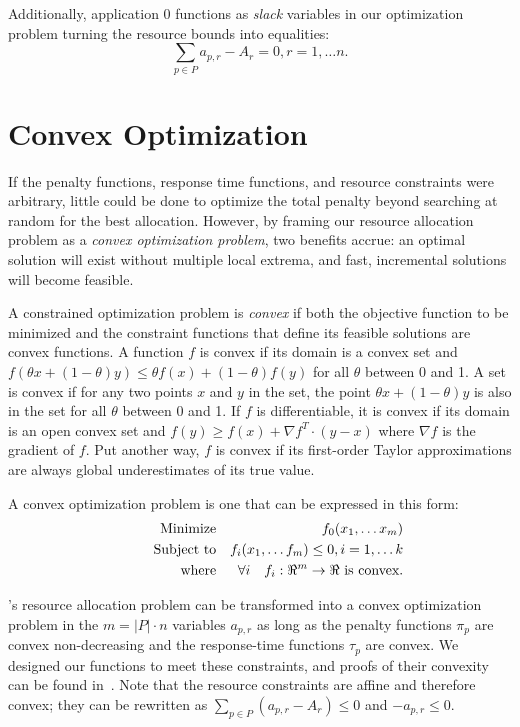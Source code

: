 Additionally, application 0 functions as \emph{slack} variables in our optimization problem turning the resource bounds into equalities:
\begin{equation}
\sum_{p\in P} a_{p,r} - A_r = 0, r = 1,\dots n.
\end{equation}

\section{Convex Optimization}

If the penalty functions, response time functions, and resource
constraints were arbitrary, little could be done to optimize the total
penalty beyond searching at random for the best allocation.  However,
by framing our resource allocation problem as a \emph{convex
  optimization problem}\cite{BoVa}, two benefits accrue: an optimal
solution will exist without multiple local extrema, and fast,
incremental solutions will become feasible.

A constrained optimization problem is \emph{convex} if both the objective function to be minimized
and the constraint functions that define its feasible solutions are convex functions.
A function $f$ is convex if its domain is a convex set and
$f(\theta x + (1-\theta)y) \leq \theta f(x) + (1-\theta)f(y)$
for all $\theta$ between 0 and 1.
A set is convex if for any two points $x$ and $y$ in the set, the point
$\theta x + (1-\theta)y$
is also in the set for all $\theta$ between 0 and 1.
If $f$ is differentiable, it is convex if its domain is an open convex set and
$f(y) \geq f(x) + \nabla f^T\cdot(y-x)$ where $\nabla f$ is the gradient of $f$.
Put another way, $f$ is convex if its first-order Taylor approximations
are always global underestimates of its true value.

A convex optimization problem is one that can be expressed in this form:
\begin{eqnarray*}
& \makebox[1in][r]{Minimize}   & f_0(x_1,\ldots x_m)                              \\
& \makebox[1in][r]{Subject to} & f_i(x_1,\ldots f_m) \leq 0, i = 1,\ldots k        \\
& \makebox[1in][r]{where}      & \forall i \quad f_i:\Re^m \rightarrow \Re \mbox{ is convex.}
\end{eqnarray*}


\pacora's resource allocation problem can be transformed into a convex
optimization problem in the $m = |P|\cdot n$ variables $a_{p,r}$ as
long as the penalty functions $\pi_p$ are convex non-decreasing and
the response-time functions $\tau_p$ are convex.  We designed our
functions to meet these constraints, and proofs of their convexity can
be found in~\cite{pacora_tr}.
Note that the resource constraints
are affine and therefore convex; they can be rewritten as $\sum_{p\in
  P} (a_{p,r} - A_r) \leq 0$ and $-a_{p,r} \leq 0$.

